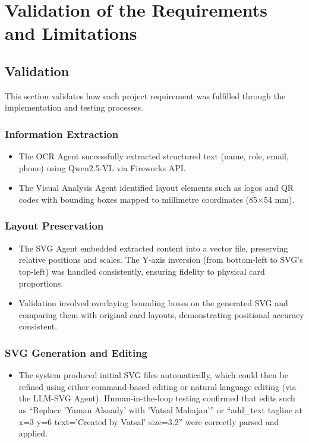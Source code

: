 \chapter{Validation of the Requirements and Limitations}

\section{Validation}
This section validates how each project requirement was fulfilled through the implementation and testing processes.

\subsection{Information Extraction}
\begin{itemize}
	\item The OCR Agent successfully extracted structured text (name, role, email, phone) using Qwen2.5-VL via Fireworks API.
	\item The Visual Analysis Agent identified layout elements such as logos and QR codes with bounding boxes mapped to millimetre coordinates (85×54 mm).
	\end{itemize}


\subsection{Layout Preservation}
\begin{itemize}
	\item The SVG Agent embedded extracted content into a vector file, preserving relative positions and scales.
	The Y-axis inversion (from bottom-left to SVG’s top-left) was handled consistently, ensuring fidelity to physical card proportions.
	\item Validation involved overlaying bounding boxes on the generated SVG and comparing them with original card layouts, demonstrating positional accuracy consistent.
\end{itemize}

\subsection{SVG Generation and Editing}
\begin{itemize}
	\item The system produced initial SVG files automatically, which could then be refined using either command-based editing or natural language editing (via the LLM-SVG Agent).
	Human-in-the-loop testing confirmed that edits such as “Replace 'Yaman Alsaady' with 'Vatsal Mahajan'.” or “add\_text tagline at x=3 y=6 text='Created by Vatsal' size=3.2” were correctly parsed and applied.
\end{itemize}

